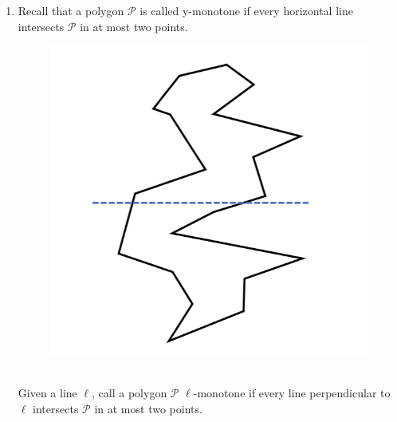 \documentclass[a4paper, 8pt, oneside]{article}
\newenvironment{sol}
    {\emph{Solution:}
    }
    {
    \qed
    }
\begin{document}
\begin{enumerate}
\begin{sol}
\textbf{Algorithm} HANDLEEVENTPOINT$(p, q$)\\
\begin{enumerate}
\item if $q$ is left point in the segment insert the segment to $\mathcal{T}$ else delete $q$ segment from $\mathcal{T}$.
\item the closet segment $s_i$ in $\mathcal{T}$ to $p$ is visible.
\end{enumerate}
Time complexity analysis - \\
Constructing the event queue is $\mathcal{O}(n\log{}n)$ \\
 iterate over all events $\mathcal{O}(n)$ and for each we update $\mathcal{T}$ which take $\mathcal{O}(\log{}n)$. \\
 So we get $\mathcal{O}(n\log{}n)$.
\end{sol}

\item \label{item:q2}  Recall that a polygon $\mathcal{P}$ is called y-monotone if every horizontal line  intersects $\mathcal{P}$ in at most two points. \\
\begin{figure}[h]
\includegraphics[scale=0.5]{example2}
\centering
\end{figure} \\
Given a line $\ell$, call a polygon $\mathcal{P}$ $\ell$-monotone if every line perpendicular to $\ell$ intersects $\mathcal{P}$ in at most two points. \\ 


\end{enumerate}
\end{document}
